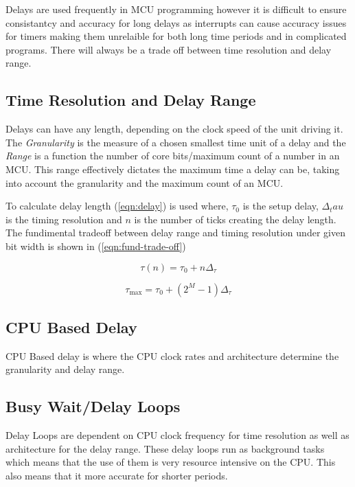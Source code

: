 Delays are used frequently in MCU programming however it is difficult to ensure consistantcy and
accuracy for long delays as interrupts can cause accuracy issues for timers making them unrelaible
for both long time periods and in complicated programs. There will always be a trade off between
time resolution and delay range.

\subsection{Time Resolution and Delay Range}
Delays can have any length, depending on the clock speed of the unit driving it. The
\textit{Granularity} is the measure of a chosen smallest time unit of a delay and the \textit{Range}
is a function the number of core bits/maximum count of a number in an MCU. This range effectively
dictates the maximum time a delay can be, taking into account the granularity and the maximum count
of an MCU.



To calculate delay length (\ref{eqn:delay}) is used where, $\tau_0$ is the setup delay, $\Delta_tau$
is the timing resolution and $n$ is the number of ticks creating the delay length. The fundimental
tradeoff between delay range and timing resolution under given bit width is shown in
(\ref{eqn:fund-trade-off})

\begin{equation}
    \tau (n) = \tau_0 + n \Delta_\tau
    \label{eqn:delay}
\end{equation}

\begin{equation}
    \tau_{\textrm{max}}=\tau_0 + (2^{M}-1) \Delta_\tau
    \label{eqn:fund-trade-off}
\end{equation}

\subsection{CPU Based Delay}
CPU Based delay is where the CPU clock rates and architecture determine the granularity and delay
range.



\subsection{Busy Wait/Delay Loops}
Delay Loops are dependent on CPU clock frequency for time resolution as well as architecture for the
delay range. These delay loops run as background tasks which means that the use of them is very
resource intensive on the CPU. This also means that it more accurate for shorter periods.\\

